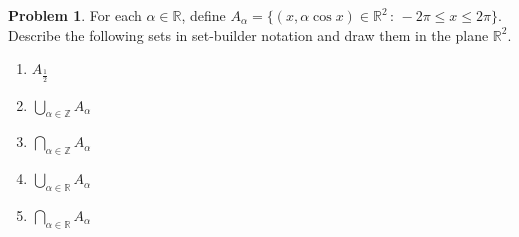 \documentclass[12pt]{amsart}
\newcounter{problem_number}[section]
\theoremstyle{named}
\theoremstyle{definition}
\newtheorem{problem}{Problem}
\newcommand{\R}{\mathbb R}
\newcommand{\Z}{\mathbb Z}
\begin{document}
\begin{problem}
	For each $\alpha\in\R$, define $A_\alpha = \{(x,\alpha\cos x)\in\R^2\,:\, -2\pi\leq x\leq 2\pi\}$.
	Describe the following sets in set-builder notation and draw them in the plane $\R^2$.
	\begin{enumerate}
		\item $\displaystyle A_\frac{1}{2}$
		\item $\displaystyle\bigcup_{\alpha\in\Z} A_\alpha$
		\item $\displaystyle\bigcap_{\alpha\in\Z} A_\alpha$
		\item $\displaystyle\bigcup_{\alpha\in\R} A_\alpha$
		\item $\displaystyle\bigcap_{\alpha\in\R} A_\alpha$
	\end{enumerate}
\end{problem}
\end{document}
